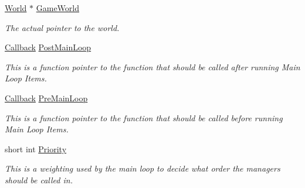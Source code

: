 \begin{DoxyCompactItemize}
\item 
\hypertarget{classphys_1_1ManagerBase_ae2f158b4b2fef1bf2bee2524e0236c7b}{
\hyperlink{classphys_1_1World}{World} $\ast$ \hyperlink{classphys_1_1ManagerBase_ae2f158b4b2fef1bf2bee2524e0236c7b}{GameWorld}}
\label{classphys_1_1ManagerBase_ae2f158b4b2fef1bf2bee2524e0236c7b}

\begin{DoxyCompactList}\small\item\em The actual pointer to the world. \item\end{DoxyCompactList}\item 
\hypertarget{classphys_1_1ManagerBase_aa1e80a30f151c07e06d1f4650f315da5}{
\hyperlink{classphys_1_1ManagerBase_a753f5f0127131529767beab2502f480b}{Callback} \hyperlink{classphys_1_1ManagerBase_aa1e80a30f151c07e06d1f4650f315da5}{PostMainLoop}}
\label{classphys_1_1ManagerBase_aa1e80a30f151c07e06d1f4650f315da5}

\begin{DoxyCompactList}\small\item\em This is a function pointer to the function that should be called after running Main Loop Items. \item\end{DoxyCompactList}\item 
\hypertarget{classphys_1_1ManagerBase_a93eb2f1a30d913a4e99180b0965eb5db}{
\hyperlink{classphys_1_1ManagerBase_a753f5f0127131529767beab2502f480b}{Callback} \hyperlink{classphys_1_1ManagerBase_a93eb2f1a30d913a4e99180b0965eb5db}{PreMainLoop}}
\label{classphys_1_1ManagerBase_a93eb2f1a30d913a4e99180b0965eb5db}

\begin{DoxyCompactList}\small\item\em This is a function pointer to the function that should be called before running Main Loop Items. \item\end{DoxyCompactList}\item 
short int \hyperlink{classphys_1_1ManagerBase_a28e2690fbcf644a7780a53b81821d8ef}{Priority}
\begin{DoxyCompactList}\small\item\em This is a weighting used by the main loop to decide what order the managers should be called in. \item\end{DoxyCompactList}\end{DoxyCompactItemize}


